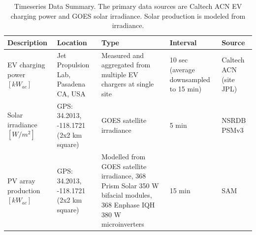\documentclass[journal,article,submit,pdftex,moreauthors]{Definitions/mdpi}
\begin{document}

\begin{table}[!h]
  \caption{Timeseries Data Summary. The primary data sources are Caltech ACN EV charging power and GOES solar irradiance. Solar production is modeled from irradiance.}
  \label{tab:data-summary}
  \begin{tabularx}{\linewidth}{XXXXX}
    \toprule
    Description                     & Location                                & Type                                                                                                                  & Interval                               & Source                                \\
    \midrule
    EV charging power $[kW_{ac}]$   & Jet Propulsion Lab, Pasadena CA, USA    & Measured and aggregated from multiple  EV chargers at single site                                                     & 10 sec (average downsampled to 15 min) & Caltech ACN (site JPL) \cite{Lee2021} \\
    Solar irradiance $[W/m^2]$      & GPS: 34.2013, -118.1721 (2x2 km square) & GOES satellite irradiance                                                                                             & 5 min                                  & NSRDB PSMv3 \cite{Sengupta2018}       \\
    PV array production $[kW_{ac}]$ & GPS: 34.2013, -118.1721 (2x2 km square) & Modelled from GOES satellite irradiance, 368 Prism Solar 350 W bifacial modules, 368 Enphase IQH 380 W microinverters & 15 min                                 & SAM \cite{NREL2022}                   \\
    \bottomrule
  \end{tabularx}
\end{table}
\end{document}

